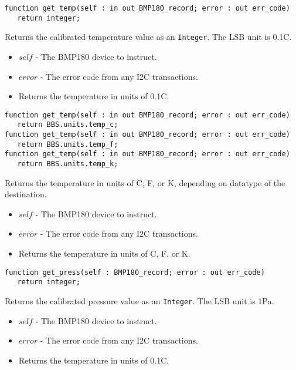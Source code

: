 \documentclass[10pt, openany]{book}
\newcommand{\indexfunc}[1]{\index[func]{#1}}
\newcommand{\datatype}[1]{\texttt{#1}}
\begin{document}
\begin{lstlisting}
function get_temp(self : in out BMP180_record; error : out err_code)
   return integer;
\end{lstlisting}
\indexfunc{get\_temp}
Returns the calibrated temperature value as an \datatype{Integer}.  The LSB unit is 0.1\degree{}C.
\begin{itemize}
  \item $self$ - The BMP180 device to instruct.
  \item $error$ - The error code from any I2C transactions.
  \item Returns the temperature in units of 0.1\degree{}C.
\end{itemize}

\begin{lstlisting}
function get_temp(self : in out BMP180_record; error : out err_code)
   return BBS.units.temp_c;
function get_temp(self : in out BMP180_record; error : out err_code)
   return BBS.units.temp_f;
function get_temp(self : in out BMP180_record; error : out err_code)
   return BBS.units.temp_k;
\end{lstlisting}
\indexfunc{get\_temp}
Returns the temperature in units of \degree{}C, \degree{}F, or K, depending on datatype of the destination.
\begin{itemize}
  \item $self$ - The BMP180 device to instruct.  \item $error$ - The error code from any I2C transactions.

  \item Returns the temperature in units of \degree{}C, \degree{}F, or K.
\end{itemize}

\begin{lstlisting}
function get_press(self : BMP180_record; error : out err_code)
   return integer;
\end{lstlisting}
\indexfunc{get\_press}
Returns the calibrated pressure value as an \datatype{Integer}.  The LSB unit is 1Pa.
\begin{itemize}
  \item $self$ - The BMP180 device to instruct.
  \item $error$ - The error code from any I2C transactions.
  \item Returns the temperature in units of 0.1\degree{}C.
\end{itemize}
\end{document}
